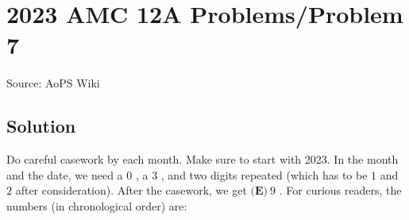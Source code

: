 \documentclass[12pt]{article}
\begin{document}
\section*{{2023 AMC 12A Problems/Problem 7}}
Source: AoPS Wiki

\subsection*{Solution}
Do careful casework by each month. Make sure to start with 2023. In the month and the date, we need a $0$ , a $3$ , and two digits repeated (which has to be $1$ and $2$ after consideration). After the casework, we get $\boxed{\textbf{(E)}~9}$ .
For curious readers, the numbers (in chronological order) are:
\end{document}
